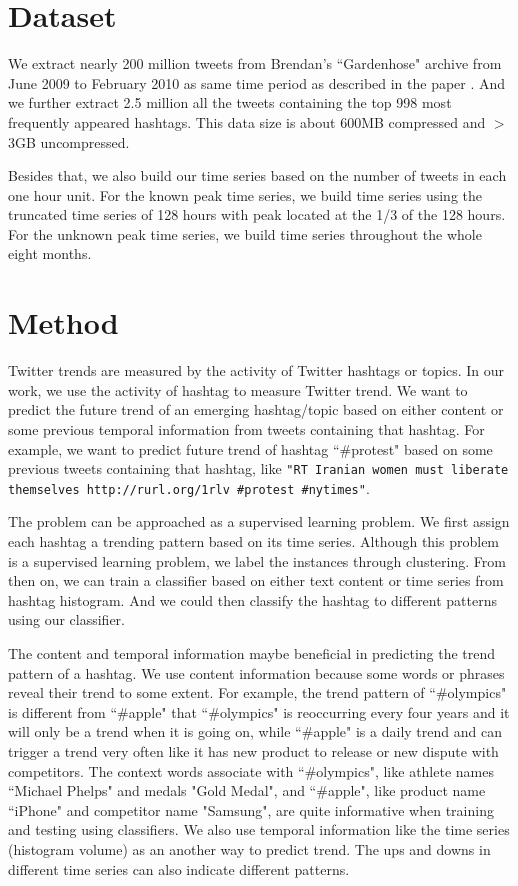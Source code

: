 \documentclass{article}
\begin{document}
\section{Dataset} 

We extract nearly 200 million tweets from Brendan's ``Gardenhose" archive from June 2009 to February 2010 as same time period as described in the paper \cite{Yang11}. And we further extract 2.5 million all the tweets containing the top 998 most frequently appeared hashtags. This data size is about 600MB compressed and $>$3GB uncompressed.  

Besides that, we also build our time series based on the number of tweets in each one hour unit. For the known peak time series, we build time series using the truncated time series of 128 hours with peak located at the 1/3 of the 128 hours. For the unknown peak time series, we build time series throughout the whole eight months. 

\section{Method}

Twitter trends are measured by the activity of Twitter hashtags or topics. In our work, we use the activity of hashtag to measure Twitter trend. We want to predict the future trend of an emerging hashtag/topic based on either content or some previous temporal information from tweets containing that hashtag. For example, we want to predict future trend of hashtag ``\#protest" based on some previous tweets containing that hashtag, like \texttt{"RT Iranian women must liberate themselves http://rurl.org/1rlv \#protest \#nytimes"}.

The problem can be approached as a supervised learning problem. We first assign each hashtag a trending pattern based on its time series. Although this problem is a supervised learning problem, we label the instances through clustering. From then on, we can train a classifier based on either text content or time series from hashtag histogram. And we could then classify the hashtag to different patterns using our classifier. 

The content and temporal information maybe beneficial in predicting the trend pattern of a hashtag. We use content information because some words or phrases reveal their trend to some extent. For example, the trend pattern of ``\#olympics" is different from ``\#apple" that ``\#olympics" is reoccurring every four years and it will only be a trend when it is going on, while ``\#apple" is a daily trend and can trigger a trend very often like it has new product to release or new dispute with competitors. The context words associate with ``\#olympics", like athlete names ``Michael Phelps" and medals "Gold Medal", and ``\#apple", like product name ``iPhone" and competitor name "Samsung", are quite informative when training and testing using classifiers. We also use temporal information like the time series (histogram volume) as an another way to predict trend. The ups and downs in different time series can also indicate different patterns.      
\end{document}

